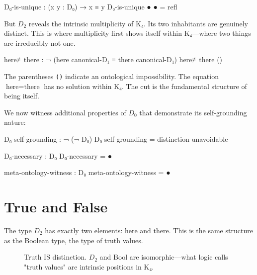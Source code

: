 \documentclass[11pt,a4paper]{book}
\begin{document}
\begin{code}
D₀-is-unique : (x y : D₀) → x ≡ y
D₀-is-unique ● ● = refl
\end{code}

But $D_2$ reveals the intrinsic multiplicity of K₄. Its two inhabitants are genuinely distinct. This is where multiplicity first shows itself within K₄—where two things are irreducibly not one.

\begin{code}
here≢there : ¬ (here canonical-D₁ ≡ there canonical-D₁)
here≢there ()
\end{code}

The parentheses \texttt{()} indicate an ontological impossibility. The equation $\text{here} = \text{there}$ has no solution within K₄. The cut is the fundamental structure of being itself.

We now witness additional properties of $D_0$ that demonstrate its self-grounding nature:

\begin{code}
D₀-self-grounding : ¬ (¬ D₀)
D₀-self-grounding = distinction-unavoidable

D₀-necessary : D₀
D₀-necessary = ●

meta-ontology-witness : D₀
meta-ontology-witness = ●
\end{code}

\chapter{True and False}

The type $D_2$ has exactly two elements: $\text{here}$ and $\text{there}$. 
This is the same structure as the Boolean type, the type of truth values.

\begin{figure}[h]
\centering
{}
\caption{Truth IS distinction. $D_2$ and Bool are isomorphic—what logic calls "truth values" are intrinsic positions in K₄.}
\label{fig:bool-emergence}
\end{figure}
\end{document}
